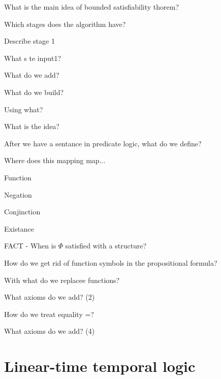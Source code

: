 \documentclass[fleqn]{article}
\begin{document}
\begin{enumerate}
    \item What is the main idea of bounded satisfiability thorem?
    \item Which stages does the algorithm have?
    \item Describe stage 1
    \begin{itemize}
        {\color{red}\item What s te input1?}
        {\color{red}\item What do we add?}
        {\color{red}\item What do we build?}
        {\color{red}\item Using what?}
        {\color{red}\item What is the idea?}
    \end{itemize}
    {\color{red}\item After we have a sentance in predicate logic, what do we define?}
    \item Where does this mapping map...
    \begin{itemize}
        {\color{red}\item Function}
        {\color{red}\item Negation}
        \item Conjinction
        {\color{red}\item Existance}
    \end{itemize}
    {\color{red}\item FACT - When is $\Phi$ satisfied with a structure?}
    {\color{red}\item How do we get rid of function symbols in the propositional formula?}
    \begin{itemize}
        {\color{red}\item With what do we replacee functions?}
        {\color{red}\item What axioms do we add? (2)}
    \end{itemize}
    {\color{red}\item How do we treat equality =?}
    \begin{itemize}
        {\color{red}\item What axioms do we add? (4)}
    \end{itemize}
\end{enumerate}


\section{Linear-time temporal logic}
\end{document}
